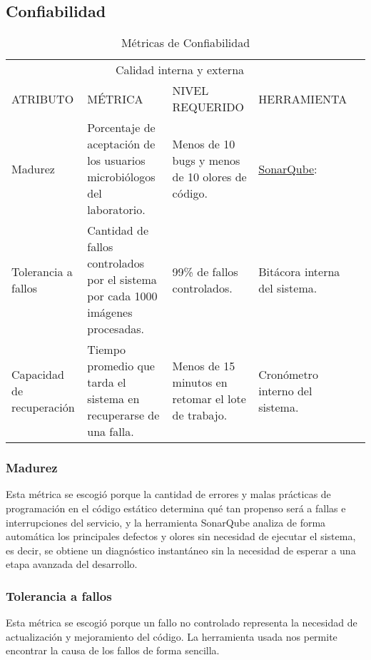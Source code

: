 \documentclass[12pt]{article}
\begin{document}
\subsection{Confiabilidad}%
\vspace*{0.3in}
\begin{table}[htb]%
\centering
\begin{tabular}{|p{4cm}|p{4cm}|p{4cm}|p{4cm}|p{4cm}|}
\hline
\multicolumn{4}{|c|}{Calidad interna y externa   } \\
\cline{1-4}
ATRIBUTO & MÉTRICA & NIVEL REQUERIDO & HERRAMIENTA\\
\hline \hline
Madurez 
& Porcentaje de aceptación de los usuarios microbiólogos del laboratorio. & 
Menos de 10 bugs y menos de 10 olores de código.
& \href{https://www.sonarqube.org/}{SonarQube}: \\ \cline{1-4}
\hline
Tolerancia a fallos 
& Cantidad de fallos controlados por el sistema por cada 1000 imágenes procesadas.
& 99\% de fallos controlados.
& Bitácora interna del sistema.\\ \cline{1-4}
\hline
Capacidad de recuperación
& Tiempo promedio que tarda el sistema en recuperarse de una falla.
& Menos de 15 minutos en retomar el lote de trabajo.
& Cronómetro interno del sistema.\\ \cline{1-4}
\hline
\end{tabular}
\caption{Métricas de Confiabilidad}
\label{tabla:final}
\end{table}%

\vspace*{0.3in}
\subsubsection{Madurez}
\vspace*{0.1in}
Esta métrica se escogió porque la cantidad de errores y malas prácticas de programación en el código estático determina qué tan propenso será a fallas e interrupciones del servicio, y la herramienta SonarQube analiza de forma automática los principales defectos y olores sin necesidad de ejecutar el sistema, es decir, se obtiene un diagnóstico instantáneo sin la necesidad de esperar a una etapa avanzada del desarrollo.
\vspace*{0.3in}
\subsubsection{Tolerancia a fallos}
\vspace*{0.1in}
Esta métrica se escogió porque un fallo no controlado representa la necesidad de actualización y mejoramiento del código. La herramienta usada nos permite encontrar la causa de los fallos de forma sencilla.
\vspace*{0.3in}
\end{document}
